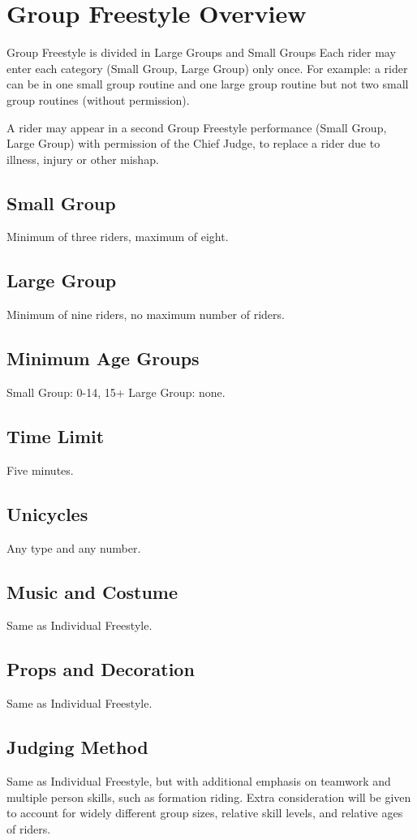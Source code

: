 \section{Group Freestyle Overview}
Group Freestyle is divided in Large Groups and Small Groups
Each rider may enter each category (Small Group, Large Group) only once. For example: a rider can be in one small group routine and one large group routine but not two small group routines (without permission).

A rider may appear in a second Group Freestyle performance (Small Group, Large Group) with permission of the Chief Judge, to replace a rider due to illness, injury or other mishap.

\subsection{Small Group}
Minimum of three riders, maximum of eight.

\subsection{Large Group}
Minimum of nine riders, no maximum number of riders.

\subsection{Minimum Age Groups}
Small Group: 0-14, 15+
Large Group: none.

\subsection{Time Limit}
Five minutes.

\subsection{Unicycles}
Any type and any number.

\subsection{Music and Costume}
Same as Individual Freestyle.

\subsection{Props and Decoration}
Same as Individual Freestyle.

\subsection{Judging Method}
Same as Individual Freestyle, but with additional emphasis on teamwork and multiple person skills, such as formation riding.
Extra consideration will be given to account for widely different group sizes, relative skill levels, and relative ages of riders.


